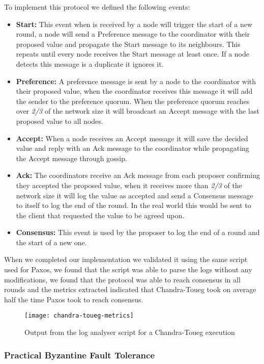 To implement this protocol we defined the following events:
\begin{itemize}
	\item \textbf{Start: } This event when is received by a node will trigger the start of a new round,
a node will send a Preference message to the coordinator with their proposed value and propagate the Start message
to its neighbours. This repeats until every node receives the Start message at least once. If a node detects
this message is a duplicate it ignores it.
	\item \textbf{Preference: } A preference message is sent by a node to the coordinator with their proposed value,
	when the coordinator receives this message it will add the sender to the preference quorum. When the preference quorum
	reaches over \textit{2/3} of the network size it will broadcast an Accept message with the last proposed value to all nodes.
	\item \textbf{Accept: } When a node receives an Accept message it will save the decided value and reply
	with an Ack message to the coordinator while propagating the Accept message through gossip.
	\item \textbf{Ack: } The coordinators receive an Ack message from each proposer confirming they accepted the proposed value,
	when it receives more than \textit{2/3} of the network size it will log the value as accepted and send a Consensus message
	to itself to log the end of the round. In the real world this would be sent to the client that requested the value to be agreed upon.
	\item \textbf{Consensus: }	This event is used by the proposer to log the end of a round and the start of a new one.
\end{itemize}

When we completed our implementation we validated it using the same script used for Paxos,
we found that the script was able to parse the logs without any modifications, we found that
the protocol was able to reach consensus in all rounds and the metrics extracted indicated that
Chandra-Toueg took on average half the time Paxos took to reach consensus.

\begin{figure}[h]
	\centering
	\texttt{[image: chandra-toueg-metrics]}
	\caption{Output from the log analyser script for a Chandra-Toueg execution}
	\label{fig:chandra-toueg-metrics}
\end{figure}

\subsubsection{Practical Byzantine Fault Tolerance}\label{sub:practical_byzantine_fault_tolerance}

